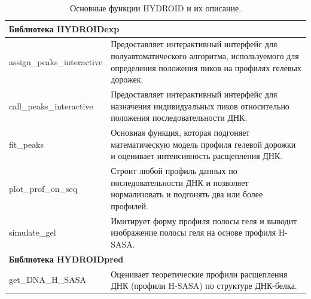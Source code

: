 \begin{table}[h!]
    \centering
    \begin{tabularx}{\textwidth}{|X|X|}
        \hline
        \multicolumn{2}{|l|}{\textbf{Библиотека HYDROIDexp}} \\
        \hline
        assign\_peaks\_interactive & Предоставляет интерактивный интерфейс для полуавтоматического алгоритма, используемого для определения положения пиков на профилях гелевых дорожек.\\
        \hline
        call\_peaks\_interactive & Предоставляет интерактивный интерфейс для назначения индивидуальных пиков относительно положения последовательности ДНК.\\
        \hline
        fit\_peaks & Основная функция, которая подгоняет математическую модель профиля гелевой дорожки и оценивает интенсивность расщепления ДНК.\\
        \hline
        plot\_prof\_on\_seq & Строит любой профиль данных по последовательности ДНК и позволяет нормализовать и подгонять два или более профилей.\\
        \hline
        simulate\_gel & Имитирует форму профиля полосы геля и выводит изображение полосы геля на основе профиля H-SASA.\\
        \hline
        \multicolumn{2}{l|}{\textbf{Библиотека HYDROIDpred}} \\
        \hline
        get\_DNA\_H\_SASA & Оценивает теоретические профили расщепления ДНК (профили H-SASA) по структуре ДНК-белка.\\
        \hline
    \end{tabularx}
    \caption{Основные функции HYDROID и их описание.}
    \label{tab:p5_t1}
\end{table}



